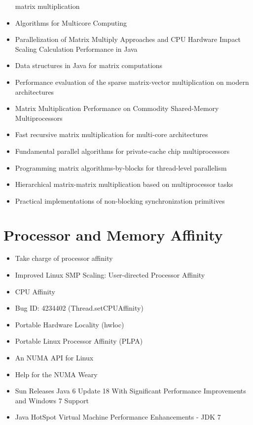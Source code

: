 \begin{itemize}
  matrix multiplication \cite{Hunold2008}
\item[\textbullet] Algorithms for Multicore Computing
  \cite{Ramachandran2008}
\item[\textbullet] Parallelization of Matrix Multiply Approaches and
  CPU Hardware Impact Scaling Calculation Performance in Java
  \cite{Kim2010}
\item[\textbullet] Data structures in Java for matrix computations
  \cite{Gundersen2004}
\item[\textbullet] Performance evaluation of the sparse matrix-vector
  multiplication on modern architectures \cite{Goumas2009}
\item[\textbullet] Matrix Multiplication Performance on Commodity
  Shared-Memory Multiprocessors \cite{Tsilikas2004}
\item[\textbullet] Fast recursive matrix multiplication for multi-core
  architectures \cite{Runger2010}
\item[\textbullet] Fundamental parallel algorithms for private-cache
  chip multiprocessors \cite{Arge2008}
\item[\textbullet] Programming matrix algorithms-by-blocks for
  thread-level parallelism \cite{Quintana-Orti2009}
\item[\textbullet] Hierarchical matrix-matrix multiplication based on
  multiprocessor tasks \cite{Hunold2004}
\item[\textbullet] Practical implementations of non-blocking
  synchronization primitives \cite{Moir1997}
\end{itemize}


\section*{Processor and Memory Affinity}
\label{sec:lr-processor-and-memory-affinity}

\begin{itemize}
\item[\checkmark] Take charge of processor affinity \cite{Dow2005}
\item[\checkmark] Improved Linux SMP Scaling: User-directed Processor Affinity
  \cite{Foong2008}
\item[\checkmark] CPU Affinity \cite{Love2003}
\item[\checkmark] Bug ID: 4234402 (Thread.setCPUAffinity)
  \cite{Oracle1999}
\item[\checkmark] Portable Hardware Locality (hwloc)
  \cite{OpenMPI2010}
\item[\checkmark] Portable Linux Processor Affinity (PLPA)
  \cite{OpenMPI2010a}
\item[\checkmark] An NUMA API for Linux \cite{Kleen2004}
\item[\checkmark] Help for the NUMA Weary \cite{Masamitsu2008}
\item[\checkmark] Sun Releases Java 6 Update 18 With Significant
  Performance Improvements and Windows 7 Support \cite{Humble2010}
\item[\checkmark] Java HotSpot Virtual Machine Performance
  Enhancements - JDK 7 \cite{Oracle2010}
\end{itemize}


